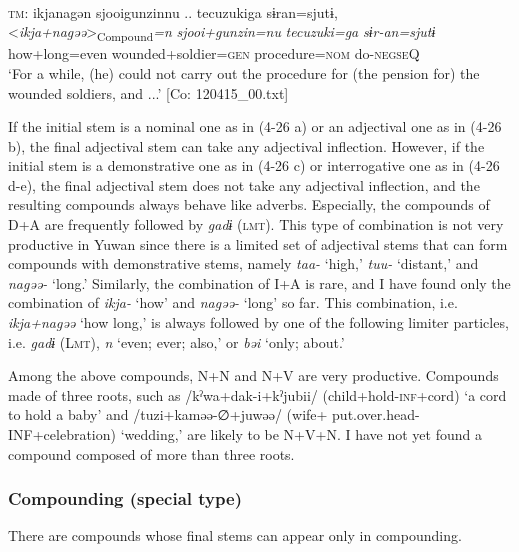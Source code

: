 \ex{}\\\label{ex:4.26e}
\glll    \textsc{tm}:  ikjanagən  {\textbar}sjooigunzin{\textbar}nu ..  {\textbar}tecuzuki{\textbar}ga  sɨran=sjutɨ,    \\
      <\textit{ikja+nagəə}>\textsubscript{Compound}\textit{=n}  \textit{sjooi+gunzin=nu}  \textit{tecuzuki=ga}       \textit{sɨr-an=sjutɨ}    \\
      how+long=even  wounded+soldier=\textsc{gen}  procedure=\textsc{nom}     do-\textsc{negseQ}        \\
    \glt       ‘For a while, (he) could not carry out the procedure for (the pension for) the wounded soldiers, and ...’ [Co: 120415\_00.txt]
    \z
\z

If the initial stem is a nominal one as in (4-26 a) or an adjectival one as in (4-26 b), the final adjectival stem can take any adjectival inflection. However, if the initial stem is a demonstrative one as in (4-26 c) or interrogative one as in (4-26 d-e), the final adjectival stem does not take any adjectival inflection, and the resulting compounds always behave like adverbs. Especially, the compounds of D+A are frequently followed by \textit{gadɨ} (\textsc{lmt}). This type of combination is not very productive in Yuwan since there is a limited set of adjectival stems that can form compounds with demonstrative stems, namely \textit{taa-} ‘high,’ \textit{tuu-} ‘distant,’ and \textit{nagəə-} ‘long.’ Similarly, the combination of I+A is rare, and I have found only the combination of \textit{ikja-} ‘how’ and \textit{nagəə-} ‘long’ so far. This combination, i.e. \textit{ikja+nagəə} ‘how long,’ is always followed by one of the following limiter particles, i.e. \textit{gadɨ} (L\textsc{mt}), \textit{n} ‘even; ever; also,’ or \textit{bəi} ‘only; about.’

Among the above compounds, N+N and N+V are very productive. Compounds made of three roots, such as /kˀwa+dak-i+kˀjubii/ (child+hold-\textsc{inf}+cord) ‘a cord to hold a baby’ and /tuzi+kaməə-∅+juwəə/ (wife+ put.over.head-INF+celebration) ‘wedding,’ are likely to be N+V+N. I have not yet found a compound composed of more than three roots.

\subsubsection{Compounding (special type)}\label{sec:4.2.3.2}

There are compounds whose final stems can appear only in compounding.

